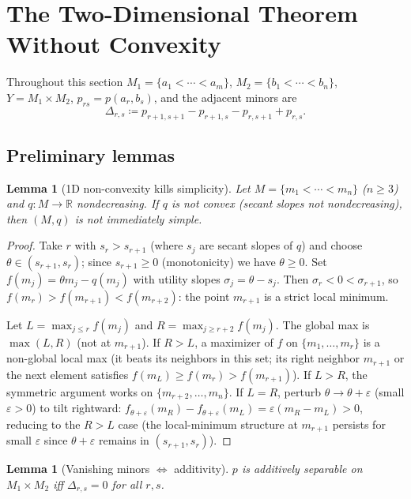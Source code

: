 \documentclass[11pt]{article}
\newtheorem{lemma}[theorem]{Lemma}
\newcommand{\R}{\mathbb{R}}
\begin{document}
\section{The Two-Dimensional Theorem Without Convexity}%
\label{sec:2d}

Throughout this section $M_1 = \{a_1 < \cdots < a_m\}$,
$M_2 = \{b_1 < \cdots < b_n\}$, $Y = M_1 \times M_2$,
$p_{rs} = p(a_r, b_s)$, and the adjacent minors are
\[
  \Delta_{r,s} \coloneqq p_{r+1,s+1} - p_{r+1,s} - p_{r,s+1} + p_{r,s}.
\]

\subsection{Preliminary lemmas}

\begin{lemma}[1D non-convexity kills simplicity]%
\label{lem:1d-convex}
Let $M = \{m_1 < \cdots < m_n\}$ ($n \geq 3$) and
$q \colon M \to \R$ nondecreasing.  If $q$ is not convex (secant
slopes not nondecreasing), then $(M, q)$ is not immediately simple.
\end{lemma}

\begin{proof}
Take $r$ with $s_r > s_{r+1}$ (where $s_j$ are secant slopes of $q$)
and choose $\theta \in (s_{r+1}, s_r)$; since $s_{r+1} \geq 0$
(monotonicity) we have $\theta \geq 0$.  Set
$f(m_j) = \theta m_j - q(m_j)$ with utility slopes
$\sigma_j = \theta - s_j$.  Then $\sigma_r < 0 < \sigma_{r+1}$, so
$f(m_r) > f(m_{r+1}) < f(m_{r+2})$: the point $m_{r+1}$ is a strict
local minimum.

Let $L = \max_{j \leq r} f(m_j)$ and $R = \max_{j \geq r+2} f(m_j)$.
The global max is $\max(L, R)$ (not at $m_{r+1}$).  If $R > L$, a
maximizer of $f$ on $\{m_1, \dots, m_r\}$ is a non-global local max
(it beats its neighbors in this set; its right neighbor $m_{r+1}$ or
the next element satisfies $f(m_L) \geq f(m_r) > f(m_{r+1})$).
If $L > R$, the symmetric argument works on
$\{m_{r+2}, \dots, m_n\}$.  If $L = R$, perturb
$\theta \to \theta + \varepsilon$ (small $\varepsilon > 0$) to tilt
rightward: $f_{\theta+\varepsilon}(m_R) - f_{\theta+\varepsilon}(m_L)
= \varepsilon(m_R - m_L) > 0$, reducing to the $R > L$ case (the
local-minimum structure at $m_{r+1}$ persists for small $\varepsilon$
since $\theta + \varepsilon$ remains in $(s_{r+1}, s_r)$).
\end{proof}

\begin{lemma}[Vanishing minors $\Leftrightarrow$ additivity]%
\label{lem:minor-additive}
$p$ is additively separable on $M_1 \times M_2$ iff
$\Delta_{r,s} = 0$ for all $r, s$.
\end{lemma}
\end{document}
